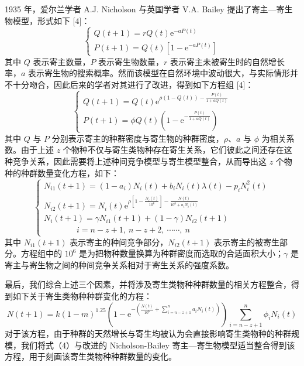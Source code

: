 \documentclass[11pt,a4paper]{ctexart}
\begin{document}
1935 年，爱尔兰学者 A.J. Nicholson 与英国学者 V.A. Bailey 提出了寄主—寄生物模型，形式如下 [4]：
\begin{equation}
\begin{cases}
Q(t+1)=rQ(t)\mathrm{e}^{-aP(t)}\\
P(t+1)=Q(t)\left[1-\mathrm{e}^{-aP(t)}\right]
\end{cases}
\end{equation}
其中 $Q$ 表示寄主数量，$P$ 表示寄生物数量，$r$ 表示寄主未被寄生时的自然增长率，$a$ 表示寄生物的搜索概率。然而该模型在自然环境中波动很大，与实际情形并不十分吻合，因此后来的学者对其进行了改进，得到如下方程组 [4]：
\begin{equation}
\begin{cases}
Q(t+1)=Q(t)\mathrm{e}^{\rho\left(1-Q(t)\right)-\frac{P(t)}{1+aQ(t)}}\\[6pt]
P(t+1)=\phi Q(t)\left(1-\mathrm{e}^{-\frac{P(t)}{1+aQ(t)}}\right)
\end{cases}
\end{equation}
其中 $Q$ 与 $P$ 分别表示寄主的种群密度与寄生物的种群密度，$\rho$、$a$ 与 $\phi$ 为相关系数。由于上述 $z$ 个物种不仅与寄生类物种存在寄生关系，它们彼此之间还存在这种竞争关系，因此需要将上述种间竞争模型与寄生模型整合，从而导出这 $z$ 个物种的种群数量变化方程，如下：
\begin{equation}
\begin{cases}
N_{i1}(t+1)=(1-a_{i})N_{i}(t)+b_{i}N_{i}(t)\lambda(t)-p_{i}N_{i}^{2}(t)\\[6pt]
N_{i2}(t+1)=N_{i}(t)\mathrm{e}^{\rho\left[1-\frac{N_{i}(t)}{10^{6}}\right]-\frac{N(t)}{10^{6}+a_{i}N_{i}(t)}}\\[6pt]
N_{i}(t+1)=\gamma N_{i1}(t+1)+(1-\gamma)N_{i2}(t+1)\\[6pt]
\qquad\qquad i=n-z+1,\ n-z+2,\ \cdots\cdots,\ n
\end{cases}
\end{equation}
其中 $N_{i1}(t+1)$ 表示寄主的种间竞争部分，$N_{i2}(t+1)$ 表示寄主的被寄生部分。方程组中的 $10^{6}$ 是为把物种数量换算为种群密度而选取的合适面积大小；$\gamma$ 是寄主与寄生物之间的种间竞争关系相对于寄生关系的强度系数。

最后，我们综合上述三个因素，并将涉及寄生类物种种群数量的相关方程整合，得到如下关于寄生类物种种群变化的方程：
\begin{equation}
N(t+1)=k(1-m)^{1.25}\left(1-\mathrm{e}^{-\left(\frac{N(t)}{10^{6}}+\sum\limits_{i=n-z+1}^{n}a_{i}N_{i}(t)\right)}\right)\sum_{i=n-z+1}^{n}\phi_{i}N_{i}(t)
\end{equation}
对于该方程，由于种群的天然增长与寄生均被认为会直接影响寄生类物种的种群规模，我们将式（4）与改进的 Nicholson-Bailey 寄主—寄生物模型适当整合得到该方程，用于刻画该寄生类物种种群数量的变化。
\end{document}
